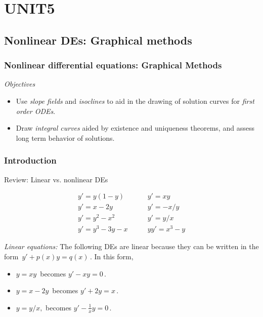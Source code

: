 \section{UNIT5}

\clearpage

\subsection{Nonlinear DEs: Graphical methods }

\subsubsection{Nonlinear differential equations: Graphical Methods}

\emph{Objectives}
\begin{itemize}
\item Use \emph{\color{blue} slope fields} and \emph{\color{blue}isoclines}
  to aid in the drawing of solution curves for \emph{\color{blue}first order ODEs}.

\item Draw \emph{\color{blue}integral curves} aided by existence and uniqueness theorems, and assess long term behavior of solutions.
\end{itemize}

\subsubsection{Introduction}

\begin{exercise}
  Review: Linear vs. nonlinear DEs
\end{exercise}
\begin{align*}
  y'=y(1-y) &\qquad y' = xy \\
  y'= x-2y &\qquad y' = -x/y \\
  y'= y^2- x^2 &\qquad y' = y/x \\
  y'= y^3 -3y -x &\qquad yy' = x^3 -y
\end{align*}

\emph{Linear equations:} The following DEs are linear because they can be written in the form
$\, y'+p(x)y=q(x)\,$.
In this form,
\begin{itemize}
\item $y = xy\,$ becomes $y' - xy = 0\, $.
\item $y = x - 2y\,$ becomes $y' + 2y = x\, $.
\item $y = y/x,$ becomes $y' - \frac{1}{x}y = 0\, $. 
\end{itemize}

